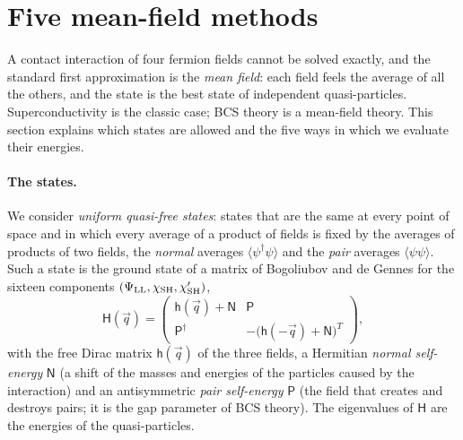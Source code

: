\documentclass[aps,prd,twocolumn,superscriptaddress,nofootinbib,floatfix,longbibliography]{revtex4-2}
\newcommand{\LL}{{\rm LL}}
\newcommand{\SH}{{\rm SH}}
\begin{document}
\section{Five mean-field methods}
\label{sec:methods}

A contact interaction of four fermion fields cannot be solved exactly, and the standard first approximation is the
\emph{mean field}: each field feels the average of all the others, and the state is the best state of independent
quasi-particles. Superconductivity is the classic case; BCS theory is a mean-field theory. This section explains which
states are allowed and the five ways in which we evaluate their energies.

\paragraph*{The states.}
We consider \emph{uniform quasi-free states}: states that are the same at every point of space and in which every
average of a product of fields is fixed by the averages of products of two fields, the \emph{normal} averages
$\langle\psi^\dagger\psi\rangle$ and the \emph{pair} averages $\langle\psi\psi\rangle$. Such a state is the ground state of
a matrix of Bogoliubov and de Gennes for the sixteen components $(\Psi_\LL,\chi_\SH,\chi'_\SH)$,
\begin{equation}
\mathsf H(\vec q)=\begin{pmatrix}\mathsf h(\vec q)+\mathsf N&\mathsf P\\\mathsf P^\dagger&-\big(\mathsf h(-\vec q)+\mathsf N\big)^T\end{pmatrix},
\label{eq:BdG}
\end{equation}
with the free Dirac matrix $\mathsf h(\vec q)$ of the three fields, a Hermitian \emph{normal self-energy} $\mathsf N$ (a
shift of the masses and energies of the particles caused by the interaction) and an antisymmetric \emph{pair
self-energy} $\mathsf P$ (the field that creates and destroys pairs; it is the gap parameter of BCS theory). The
eigenvalues of $\mathsf H$ are the energies of the quasi-particles.
\end{document}
